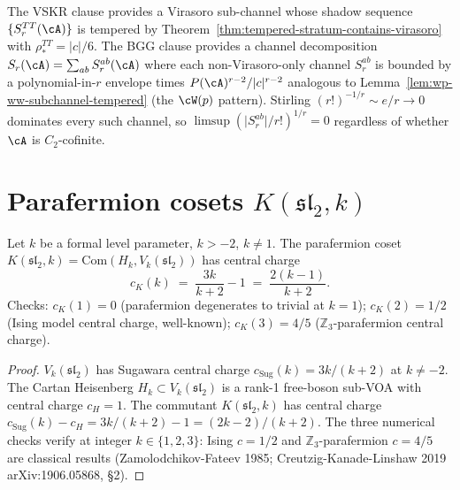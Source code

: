 \begin{remark}
\label{rem:vskr-bgg-mechanism}
The VSKR clause provides a Virasoro sub-channel whose shadow sequence
$\{S_r^{TT}(\cA)\}$ is tempered by
Theorem~\ref{thm:tempered-stratum-contains-virasoro} with
$\rho_*^{TT} = \lvert c \rvert / 6$. The BGG clause provides a
channel decomposition $S_r(\cA) = \sum_{ab} S_r^{ab}(\cA)$ where each
non-Virasoro-only channel $S_r^{ab}$ is bounded by a polynomial-in-$r$
envelope times $P(\cA)^{r-2} / \lvert c \rvert^{r-2}$ analogous to
Lemma~\ref{lem:wp-ww-subchannel-tempered} (the $\cW(p)$ pattern).
Stirling $(r!)^{-1/r} \sim e/r \to 0$ dominates every such channel,
so $\limsup (\lvert S_r^{ab} \rvert / r!)^{1/r} = 0$ regardless of
whether $\cA$ is $C_2$-cofinite.
\end{remark}

\section{Parafermion cosets $K(\mathfrak{sl}_2, k)$}
\label{sec:parafermion-cosets}

\begin{proposition}
\label{prop:parafermion-central-charge-closed-form}
\ClaimStatusProvedHere
Let $k$ be a formal level parameter, $k > -2$, $k \neq 1$. The
parafermion coset $K(\mathfrak{sl}_2, k) =
\mathrm{Com}(H_k, V_k(\mathfrak{sl}_2))$ has central charge
\[
 c_K(k)
 \;=\;
 \frac{3 k}{k + 2} - 1
 \;=\;
 \frac{2(k - 1)}{k + 2}.
\]
Checks: $c_K(1) = 0$ (parafermion degenerates to trivial at $k = 1$);
$c_K(2) = 1/2$ (Ising model central charge, well-known);
$c_K(3) = 4/5$ ($\mathbb{Z}_3$-parafermion central charge).
\end{proposition}

\begin{proof}
$V_k(\mathfrak{sl}_2)$ has Sugawara central charge
$c_{\mathrm{Sug}}(k) = 3 k / (k + 2)$ at $k \neq -2$. The Cartan
Heisenberg $H_k \subset V_k(\mathfrak{sl}_2)$ is a rank-1 free-boson
sub-VOA with central charge $c_H = 1$. The commutant
$K(\mathfrak{sl}_2, k)$ has central charge
$c_{\mathrm{Sug}}(k) - c_H = 3k/(k+2) - 1 = (2k - 2)/(k + 2)$. The
three numerical checks verify at integer $k \in \{1, 2, 3\}$: Ising
$c = 1/2$ and $\mathbb{Z}_3$-parafermion $c = 4/5$ are classical
results
(Zamolodchikov-Fateev 1985; Creutzig-Kanade-Linshaw 2019
arXiv:1906.05868, \S 2).
\end{proof}

